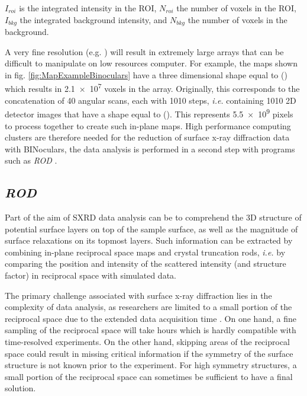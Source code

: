 $I_{roi}$ is the integrated intensity in the ROI, $N_{roi}$ the number of voxels in the ROI, $I_{bkg}$ the integrated background intensity, and $N_{bkg}$ the number of voxels in the background.

A very fine resolution (e.g. ) will result in extremely large arrays that can be difficult to manipulate on low resources computer.
For example, the maps shown in fig. \ref{fig:MapExampleBinoculars} have a three dimensional shape equal to () which results in \num{2.1e7} voxels in the array.
Originally, this corresponds to the concatenation of 40 angular scans, each with 1010 steps, \textit{i.e.} containing 1010 2D detector images that have a shape equal to ().
This represents \num{5.5e9} pixels to process together to create such in-plane maps.
High performance computing clusters are therefore needed for the reduction of surface x-ray diffraction data with BINoculars, the data analysis is performed in a second step with programs such as \textit{ROD} \parencite{Vlieg2000}.

\subsection{\textit{ROD}} \label{sec:ROD}

Part of the aim of SXRD data analysis can be to comprehend the 3D structure of potential surface layers on top of the sample surface, as well as the magnitude of surface relaxations on its topmost layers.
Such information can be extracted by combining in-plane reciprocal space maps and crystal truncation rods, \textit{i.e.} by comparing the position and intensity of the scattered intensity (and structure factor) in reciprocal space with simulated data.

The primary challenge associated with surface x-ray diffraction lies in the complexity of data analysis, as researchers are limited to a small portion of the reciprocal space due to the extended data acquisition time \parencite{Gustafson2014}.
On one hand, a fine sampling of the reciprocal space will take hours which is hardly compatible with time-resolved experiments.
On the other hand, skipping areas of the reciprocal space could result in missing critical information if the symmetry of the surface structure is not known prior to the experiment.
For high symmetry structures, a small portion of the reciprocal space can sometimes be sufficient to have a final solution.

